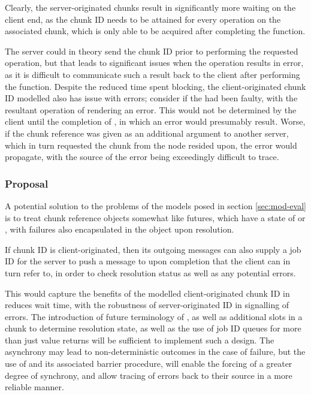 Clearly, the server-originated chunks result in significantly more waiting on
the client end, as the chunk ID needs to be attained for every operation on the
associated chunk, which is only able to be acquired after completing the
function.

The server could in theory send the chunk ID prior to performing the requested
operation, but that leads to significant issues when the operation results in
error, as it is difficult to communicate such a result back to the client after
performing the function.
Despite the reduced time spent blocking, the client-originated chunk ID
modelled also has issue with errors; consider if the  had
been faulty, with the resultant operation of  rendering an error.
This would not be determined by the client until the completion of
, in which an error would presumably result.
Worse, if the chunk reference  was given as an additional argument to
another server, which in turn requested the chunk  from the node
 resided upon, the error would propagate, with the source of the
error being exceedingly difficult to trace.

\subsubsection{Proposal}

A potential solution to the problems of the models posed in section
\cref{sec:mod-eval} is to treat chunk reference objects somewhat like futures,
which have a state of  or , with failures
also encapsulated in the object upon resolution\cite{bengtsson20:future-r}.

If chunk ID is client-originated, then its outgoing messages can also supply a
job ID for the server to push a message to upon completion that the client can
in turn refer to, in order to check resolution status as well as any potential
errors.

This would capture the benefits of the modelled client-originated chunk ID in
reduces wait time, with the robustness of server-originated ID in signalling of
errors.
The introduction of future terminology of , as well as
additional slots in a chunk to determine resolution state, as well as the use
of job ID queues for more than just value returns will be sufficient to
implement such a design.
The asynchrony may lead to non-deterministic outcomes in the case of failure,
but the use of  and its associated barrier procedure,
 will enable the forcing of a greater degree of synchrony,
and allow tracing of errors back to their source in a more reliable manner.

